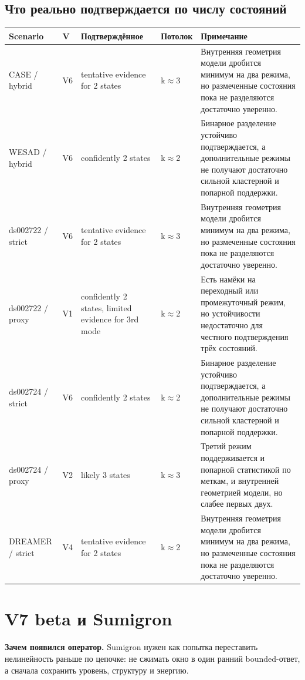 \documentclass[11pt,a4paper]{article}
\begin{document}
\subsection*{Что реально подтверждается по числу состояний}
\begin{center}
\begin{tabular}{p{2.8cm}p{0.8cm}p{4.2cm}p{1.3cm}p{6.0cm}}
\toprule
Scenario & V & Подтверждённое & Потолок & Примечание \\
\midrule
CASE / hybrid & V6 & tentative evidence for 2 states & k\ensuremath{\approx}3 & Внутренняя геометрия модели дробится минимум на два режима, но размеченные состояния пока не разделяются достаточно уверенно. \\
WESAD / hybrid & V6 & confidently 2 states & k\ensuremath{\approx}2 & Бинарное разделение устойчиво подтверждается, а дополнительные режимы не получают достаточно сильной кластерной и попарной поддержки. \\
ds002722 / strict & V6 & tentative evidence for 2 states & k\ensuremath{\approx}3 & Внутренняя геометрия модели дробится минимум на два режима, но размеченные состояния пока не разделяются достаточно уверенно. \\
ds002722 / proxy & V1 & confidently 2 states, limited evidence for 3rd mode & k\ensuremath{\approx}2 & Есть намёки на переходный или промежуточный режим, но устойчивости недостаточно для честного подтверждения трёх состояний. \\
ds002724 / strict & V6 & confidently 2 states & k\ensuremath{\approx}2 & Бинарное разделение устойчиво подтверждается, а дополнительные режимы не получают достаточно сильной кластерной и попарной поддержки. \\
ds002724 / proxy & V2 & likely 3 states & k\ensuremath{\approx}3 & Третий режим поддерживается и попарной статистикой по меткам, и внутренней геометрией модели, но слабее первых двух. \\
DREAMER / strict & V4 & tentative evidence for 2 states & k\ensuremath{\approx}2 & Внутренняя геометрия модели дробится минимум на два режима, но размеченные состояния пока не разделяются достаточно уверенно. \\
\bottomrule
\end{tabular}
\end{center}

\section{V7 beta и Sumigron}
\textbf{Зачем появился оператор.} Sumigron нужен как попытка переставить нелинейность раньше по цепочке: не сжимать окно в один ранний bounded-ответ, а сначала сохранить уровень, структуру и энергию.
\end{document}
